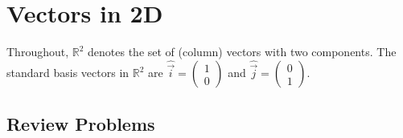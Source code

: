 \section{Vectors in 2D}

Throughout, $\mathbb{R}^2$ denotes the set of (column) vectors with two components. The standard basis vectors in $\mathbb{R}^2$ are $\hat{\vec{i}} = \begin{pmatrix} 1 \\ 0 \end{pmatrix}$ and $\hat{\vec{j}} = \begin{pmatrix} 0 \\ 1 \end{pmatrix}$.

\subsection{Review Problems}


